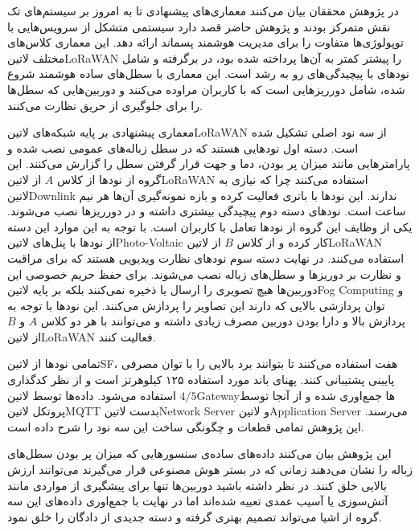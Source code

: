 
در پژوهش  محققان بیان می‌کنند معماری‌های پیشنهادی تا به امروز بر سیستم‌های تک نقش متمرکز بودند و پژوهش حاضر قصد دارد سیستمی متشکل از سرویس‌هایی با توپولوژی‌ها متفاوت را
برای مدیریت هوشمند پسماند ارائه دهد. این معماری کلاس‌های مختلف ‌لاتین{LoRaWAN} را پیشتر کمتر به آن‌ها پرداخته شده بود، در برگرفته و شامل نودهای با پیچیدگی‌های رو به رشد است.
این معماری با سطل‌های ساده هوشمند شروع شده، شامل دورریزهایی است که با کاربران مراوده می‌کنند و دوربین‌هایی که سطل‌ها را برای جلوگیری از حریق نظارت می‌کنند.

معماری پیشنهادی بر پایه شبکه‌های ‌لاتین{LoRaWAN} از سه نود اصلی تشکیل شده است.
دسته اول نودهایی هستند که در سطل زباله‌های عمومی نصب شده و پارامترهایی مانند
میزان پر بودن، دما و جهت قرار گرفتن سطل را گزارش می‌کنند. این گروه از نودها از کلاس $A$ از ‌لاتین{LoRaWAN} استفاده می‌کنند چرا که نیازی به ‌لاتین{Downlink} ندارند.
این نودها با باتری فعالیت کرده و بازه نمونه‌گیری آن‌ها هر نیم ساعت است.
نودهای دسته دوم پیچیدگی بیشتری داشته و در دورریزها نصب می‌شوند. یکی از وظایف این گروه از نودها تعامل با کاربران است.
با توجه به این موارد این دسته از نودها با پنل‌های ‌لاتین{Photo-Voltaic} کار کرده و
از کلاس $B$ از ‌لاتین{LoRaWAN} استفاده می‌کنند.
در نهایت دسته سوم نودهای نظارت ویدیویی هستند که برای مراقبت و نظارت بر دوریزها و سطل‌های زباله نصب می‌شوند. برای حفظ حریم خصوصی این دوربین‌ها هیچ تصویری را ارسال یا ذخیره نمی‌کنند
بلکه بر پایه ‌لاتین{Fog Computing} و توان پردازشی بالایی که دارند این تصاویر را پردازش می‌کنند.
این نودها با توجه به پردازش بالا و دارا بودن دوربین مصرف زیادی داشته و می‌توانند با هر دو کلاس $A$ و $B$ از ‌لاتین{LoRaWAN} فعالیت کنند.

تمامی نودها از ‌لاتین{SF}، هفت استفاده می‌کنند تا بتوانند برد بالایی را با توان مصرفی پایینی پشتیبانی کنند. پهنای باند مورد استفاده ۱۲۵ کیلوهرتز است و از نظر کدگذاری $4/5$ استفاده می‌شود.
داده‌ها توسط ‌لاتین{Gateway}ها جمع‌اوری شده و از آنجا توسط پروتکل ‌لاتین{MQTT} بدست ‌لاتین{Network Server} و ‌لاتین{Application Server} می‌رسند.
این پژوهش تمامی قطعات و چگونگی ساخت این سه نود را شرح داده است.

این پژوهش بیان می‌کنند داده‌های ساده‌ی سنسورهایی که میزان پر بودن سطل‌های زباله را نشان می‌دهند زمانی که در بستر هوش مصنوعی قرار می‌گیرند می‌توانند ارزش بالایی خلق کنند.
در نظر داشته باشید دوربین‌ها تنها برای پیشگیری از مواردی مانند آتش‌سوزی یا آسیب عمدی تعبیه شده‌اند اما در نهایت با جمع‌اوری داده‌های این سه گروه از اشیا می‌تواند تصمیم بهتری گرفته و دسته جدیدی از دادگان را خلق نمود.


